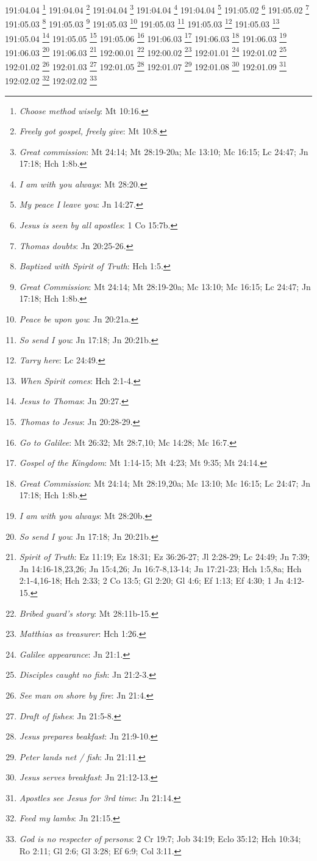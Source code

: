 191:04.04 \footnote{\textit{Choose method wisely}: Mt 10:16.}
191:04.04 \footnote{\textit{Freely got gospel, freely give}: Mt 10:8.}
191:04.04 \footnote{\textit{Great commission}: Mt 24:14; Mt 28:19-20a; Mc 13:10; Mc 16:15; Lc 24:47; Jn 17:18; Hch 1:8b.}
191:04.04 \footnote{\textit{I am with you always}: Mt 28:20.}
191:04.04 \footnote{\textit{My peace I leave you}: Jn 14:27.}
191:05.02 \footnote{\textit{Jesus is seen by all apostles}: 1 Co 15:7b.}
191:05.02 \footnote{\textit{Thomas doubts}: Jn 20:25-26.}
191:05.03 \footnote{\textit{Baptized with Spirit of Truth}: Hch 1:5.}
191:05.03 \footnote{\textit{Great Commission}: Mt 24:14; Mt 28:19-20a; Mc 13:10; Mc 16:15; Lc 24:47; Jn 17:18; Hch 1:8b.}
191:05.03 \footnote{\textit{Peace be upon you}: Jn 20:21a.}
191:05.03 \footnote{\textit{So send I you}: Jn 17:18; Jn 20:21b.}
191:05.03 \footnote{\textit{Tarry here}: Lc 24:49.}
191:05.03 \footnote{\textit{When Spirit comes}: Hch 2:1-4.}
191:05.04 \footnote{\textit{Jesus to Thomas}: Jn 20:27.}
191:05.05 \footnote{\textit{Thomas to Jesus}: Jn 20:28-29.}
191:05.06 \footnote{\textit{Go to Galilee}: Mt 26:32; Mt 28:7,10; Mc 14:28; Mc 16:7.}
191:06.03 \footnote{\textit{Gospel of the Kingdom}: Mt 1:14-15; Mt 4:23; Mt 9:35; Mt 24:14.}
191:06.03 \footnote{\textit{Great Commission}: Mt 24:14; Mt 28:19,20a; Mc 13:10; Mc 16:15; Lc 24:47; Jn 17:18; Hch 1:8b.}
191:06.03 \footnote{\textit{I am with you always}: Mt 28:20b.}
191:06.03 \footnote{\textit{So send I you}: Jn 17:18; Jn 20:21b.}
191:06.03 \footnote{\textit{Spirit of Truth}: Ez 11:19; Ez 18:31; Ez 36:26-27; Jl 2:28-29; Lc 24:49; Jn 7:39; Jn 14:16-18,23,26; Jn 15:4,26; Jn 16:7-8,13-14; Jn 17:21-23; Hch 1:5,8a; Hch 2:1-4,16-18; Hch 2:33; 2 Co 13:5; Gl 2:20; Gl 4:6; Ef 1:13; Ef 4:30; 1 Jn 4:12-15.}
192:00.01 \footnote{\textit{Bribed guard's story}: Mt 28:11b-15.}
192:00.02 \footnote{\textit{Matthias as treasurer}: Hch 1:26.}
192:01.01 \footnote{\textit{Galilee appearance}: Jn 21:1.}
192:01.02 \footnote{\textit{Disciples caught no fish}: Jn 21:2-3.}
192:01.02 \footnote{\textit{See man on shore by fire}: Jn 21:4.}
192:01.03 \footnote{\textit{Draft of fishes}: Jn 21:5-8.}
192:01.05 \footnote{\textit{Jesus prepares beakfast}: Jn 21:9-10.}
192:01.07 \footnote{\textit{Peter lands net / fish}: Jn 21:11.}
192:01.08 \footnote{\textit{Jesus serves breakfast}: Jn 21:12-13.}
192:01.09 \footnote{\textit{Apostles see Jesus for 3rd time}: Jn 21:14.}
192:02.02 \footnote{\textit{Feed my lambs}: Jn 21:15.}
192:02.02 \footnote{\textit{God is no respecter of persons}: 2 Cr 19:7; Job 34:19; Eclo 35:12; Hch 10:34; Ro 2:11; Gl 2:6; Gl 3:28; Ef 6:9; Col 3:11.}
